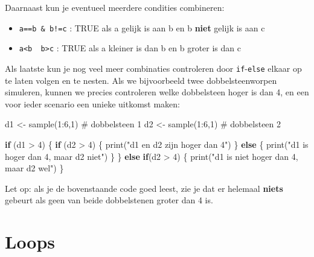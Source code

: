 \documentclass[
  b5paper,
  DIV=11,
  numbers=noendperiod]{scrreprt}
\newenvironment{Shaded}{\begin{snugshade}}{\end{snugshade}}
\newcommand{\CommentTok}[1]{\textcolor[rgb]{0.37,0.37,0.37}{#1}}
\newcommand{\ControlFlowTok}[1]{\textcolor[rgb]{0.00,0.23,0.31}{\textbf{#1}}}
\newcommand{\DecValTok}[1]{\textcolor[rgb]{0.68,0.00,0.00}{#1}}
\newcommand{\FunctionTok}[1]{\textcolor[rgb]{0.28,0.35,0.67}{#1}}
\newcommand{\NormalTok}[1]{\textcolor[rgb]{0.00,0.23,0.31}{#1}}
\newcommand{\OtherTok}[1]{\textcolor[rgb]{0.00,0.23,0.31}{#1}}
\newcommand{\SpecialCharTok}[1]{\textcolor[rgb]{0.37,0.37,0.37}{#1}}
\newcommand{\StringTok}[1]{\textcolor[rgb]{0.13,0.47,0.30}{#1}}
\theoremstyle{definition}
\theoremstyle{remark}
\begin{document}
Daarnaast kun je eventueel meerdere condities combineren:

\begin{itemize}
\item
  \texttt{a==b\ \&\ b!=c} : TRUE als a gelijk is aan b en b
  \textbf{niet} gelijk is aan c
\item
  \texttt{a\textless{}b\ \textbar{}\ b\textgreater{}c} : TRUE als a
  kleiner is dan b en b groter is dan c
\end{itemize}

Als laatste kun je nog veel meer combinaties controleren door
\texttt{if}-\texttt{else} elkaar op te laten volgen en te nesten. Als we
bijvoorbeeld twee dobbelsteenworpen simuleren, kunnen we precies
controleren welke dobbelsteen hoger is dan 4, en een voor ieder scenario
een unieke uitkomst maken:

\begin{Shaded}
\begin{Highlighting}[]
\NormalTok{d1 }\OtherTok{\textless{}{-}} \FunctionTok{sample}\NormalTok{(}\DecValTok{1}\SpecialCharTok{:}\DecValTok{6}\NormalTok{,}\DecValTok{1}\NormalTok{) }\CommentTok{\# dobbelsteen 1}
\NormalTok{d2 }\OtherTok{\textless{}{-}} \FunctionTok{sample}\NormalTok{(}\DecValTok{1}\SpecialCharTok{:}\DecValTok{6}\NormalTok{,}\DecValTok{1}\NormalTok{) }\CommentTok{\# dobbelsteen 2}

\ControlFlowTok{if}\NormalTok{ (d1 }\SpecialCharTok{\textgreater{}} \DecValTok{4}\NormalTok{) \{}
  \ControlFlowTok{if}\NormalTok{ (d2 }\SpecialCharTok{\textgreater{}} \DecValTok{4}\NormalTok{) \{}
    \FunctionTok{print}\NormalTok{(}\StringTok{"d1 en d2 zijn hoger dan 4"}\NormalTok{)}
\NormalTok{  \} }\ControlFlowTok{else}\NormalTok{ \{}
    \FunctionTok{print}\NormalTok{(}\StringTok{"d1 is hoger dan 4, maar d2 niet"}\NormalTok{)}
\NormalTok{  \}}
\NormalTok{\} }\ControlFlowTok{else} \ControlFlowTok{if}\NormalTok{(d2 }\SpecialCharTok{\textgreater{}} \DecValTok{4}\NormalTok{) \{}
  \FunctionTok{print}\NormalTok{(}\StringTok{"d1 is niet hoger dan 4, maar d2 wel"}\NormalTok{)}
\NormalTok{\} }
\end{Highlighting}
\end{Shaded}

Let op: als je de bovenstaande code goed leest, zie je dat er helemaal
\textbf{niets} gebeurt als geen van beide dobbelstenen groter dan 4 is.

\section{Loops}\label{loops}
\end{document}
